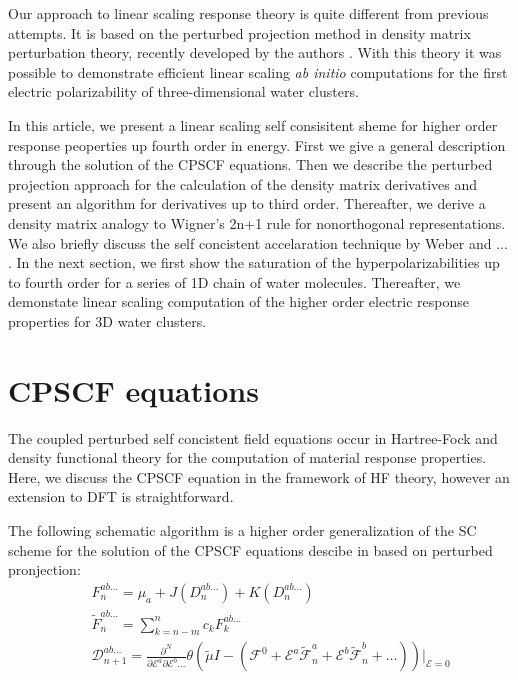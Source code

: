 \documentclass[twocolumn,showpacs,preprintnumbers,amsmath,amssymb]{revtex4}
\begin{document}
 Our approach to linear scaling response theory is quite different 
 from previous attempts. It is based on the perturbed projection
 method in density matrix perturbation theory, recently developed
 by the authors \cite{Niklasson04,Weber04}. With this theory it
 was possible to demonstrate efficient linear scaling {\em ab initio}
 computations for the first electric polarizability of three-dimensional 
 water clusters.

 In this article, we present a linear scaling self consisitent sheme
 for higher order response peoperties up fourth order in energy.
 First we give a general description through the solution of the CPSCF equations.
 Then we describe the perturbed projection approach for the calculation
 of the density matrix derivatives and present
 an algorithm for derivatives up to third order.
 Thereafter, we derive a density matrix analogy to Wigner's 2n+1
 rule for nonorthogonal representations. We also briefly discuss the
 self concistent accelaration technique by Weber and ... . In the next section,
 we first show the saturation of the hyperpolarizabilities up to fourth order
 for a series of 1D chain of water molecules. Thereafter, we demonstate
 linear scaling computation of the higher order electric response properties
 for 3D water clusters.



\section{CPSCF equations}
The coupled perturbed self concistent field equations occur in Hartree-Fock
and density functional theory for the computation of material response
properties. Here, we discuss the CPSCF equation in the framework of
HF theory, however an extension to DFT is straightforward.


The following schematic algorithm is a higher order generalization of the
SC scheme for the solution of the CPSCF equations descibe in \cite{SV} 
based on perturbed pronjection:
\begin{subequations}
\begin{eqnarray}
&&  F^{ab\ldots}_{n}=\mu_a+J(D^{ab\ldots}_n)+K(D^{ab\ldots}_n) \label{FockBuild} \\
&& \displaystyle\widetilde{F}^{ab\ldots}_{n}=\sum_{k=n-m}^{n}c_k F^{ab\ldots}_{k} \label{DDIIS} \\
&& \displaystyle\mathcal{D}^{ab\ldots}_{n+1}=
  \frac{\partial^N}{\partial\mathcal{E}^a \partial\mathcal{E}^b\ldots}
     \theta(\tilde{\mu}I-(\mathcal{F}^{0}
     +\mathcal{E}^{a}\widetilde{\mathcal{F}}^{a}_n
     +\mathcal{E}^{b}\widetilde{\mathcal{F}}^{b}_n+\ldots))
     \bigg|_{\mathcal{E}=0} \label{DDeriv}
   \end{eqnarray} 
\end{subequations}
\end{document}
